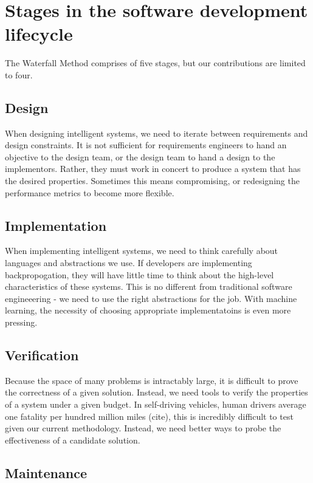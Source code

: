 \documentclass[12pt,initial,twoside,maitrise]{dms}
\numberwithin{equation}{section}
\numberwithin{table}{chapter}
\numberwithin{figure}{chapter}
\begin{document}
\section{Stages in the software development lifecycle}

The Waterfall Method comprises of five stages, but our contributions are limited to four.

\subsection{Design}

When designing intelligent systems, we need to iterate between requirements and design constraints. It is not sufficient for requirements engineers to hand an objective to the design team, or the design team to hand a design to the implementors. Rather, they must work in concert to produce a system that has the desired properties. Sometimes this means compromising, or redesigning the performance metrics to become more flexible.

\subsection{Implementation}

When implementing intelligent systems, we need to think carefully about languages and abstractions we use. If developers are implementing backpropogation, they will have little time to think about the high-level characteristics of these systems. This is no different from traditional software engineeering - we need to use the right abstractions for the job. With machine learning, the necessity of choosing appropriate implementatoins is even more pressing.

\subsection{Verification}

Because the space of many problems is intractably large, it is difficult to prove the correctness of a given solution. Instead, we need tools to verify the properties of a system under a given budget. In self-driving vehicles, human drivers average one fatality per hundred million miles (cite), this is incredibly difficult to test given our current methodology. Instead, we need better ways to probe the effectiveness of a candidate solution.

\subsection{Maintenance}
\end{document}
